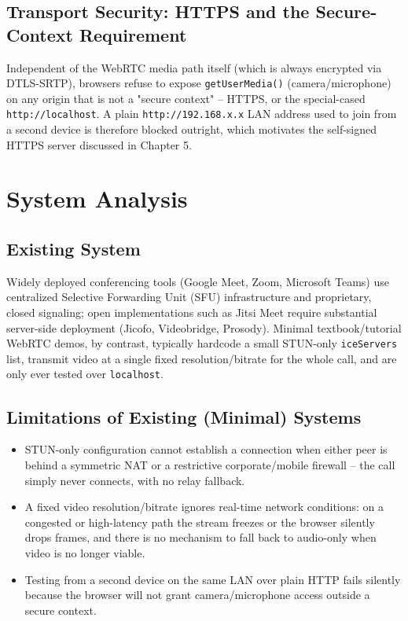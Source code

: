 \documentclass[12pt,a4paper]{report}
\begin{document}
\section{Transport Security: HTTPS and the Secure-Context Requirement}
Independent of the WebRTC media path itself (which is always encrypted via DTLS-SRTP),
browsers refuse to expose \texttt{getUserMedia()} (camera/microphone) on any origin that is
not a "secure context" -- HTTPS, or the special-cased \texttt{http://localhost}. A plain
\texttt{http://192.168.x.x} LAN address used to join from a second device is therefore
blocked outright, which motivates the self-signed HTTPS server discussed in Chapter 5.

\chapter{System Analysis}

\section{Existing System}
Widely deployed conferencing tools (Google Meet, Zoom, Microsoft Teams) use centralized
Selective Forwarding Unit (SFU) infrastructure and proprietary, closed signaling; open
implementations such as Jitsi Meet require substantial server-side deployment
(Jicofo, Videobridge, Prosody). Minimal textbook/tutorial WebRTC demos, by contrast,
typically hardcode a small STUN-only \texttt{iceServers} list, transmit video at a single
fixed resolution/bitrate for the whole call, and are only ever tested over
\texttt{localhost}.

\section{Limitations of Existing (Minimal) Systems}
\begin{itemize}[nosep]
  \item STUN-only configuration cannot establish a connection when either peer is behind a
  symmetric NAT or a restrictive corporate/mobile firewall -- the call simply never
  connects, with no relay fallback.
  \item A fixed video resolution/bitrate ignores real-time network conditions: on a
  congested or high-latency path the stream freezes or the browser silently drops frames,
  and there is no mechanism to fall back to audio-only when video is no longer viable.
  \item Testing from a second device on the same LAN over plain HTTP fails silently because
  the browser will not grant camera/microphone access outside a secure context.
\end{itemize}
\end{document}
